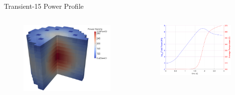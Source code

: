 \documentclass[8pt,xcolor=dvipnames]{beamer}
\begin{document}

\begin{frame}{Transient-15 Power Profile}
\begin{columns}

\begin{figure}
\includegraphics[width=\linewidth]{figures/Tran15_core2.png}
\end{figure}

\begin{figure}
\includegraphics[width=\linewidth]{figures/Tran15_profile.png}
\end{figure}

\end{columns}
\end{frame}
\end{document}
